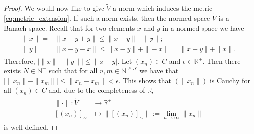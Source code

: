 \begin{proof}
We would now like to give $\tilde{V}$ a norm which induces the metric \eqref{eq:metric_extension}. If such a norm exists, then the normed space $\tilde{V}$ is a Banach space. Recall that for two elements $x$ and $y$ in a normed space we have
\begin{align}
\begin{split}
\|x\|=&\|x-y+y\|\leq\|x-y\|+\|y\|;\\
\|y\|=&\|x-y-x\|\leq\|x-y\|+\|-x\|=\|x-y\|+\|x\|.
\end{split}
\end{align} 
Therefore, $|\|x\|-\|y\||\leq\|x-y|$. Let $(x_n)\in C$ and $\epsilon\in\mathbb{R}^+$. Then there exists $N\in\mathbb{N}^+$ such that for all $n,m\in\mathbb{N}^{\geq N}$ we have that $|\|x_n\|-\|x_m\||\leq\|x_n-x_m\|<\epsilon$. This shows that $(\|x_n\|)$ is Cauchy for all $(x_n)\in C$ and, due to the completeness of $\mathbb{R}$,
\begin{align}
\begin{split}
\|\cdot\|:\tilde{V}&\rightarrow\mathbb{R}^+\\
[(x_n)]_\sim&\mapsto\|[(x_n)]_\sim\|:=\lim_{n\rightarrow\infty}\|x_n\|
\end{split}
\end{align}
is well defined. 
\end{proof}
